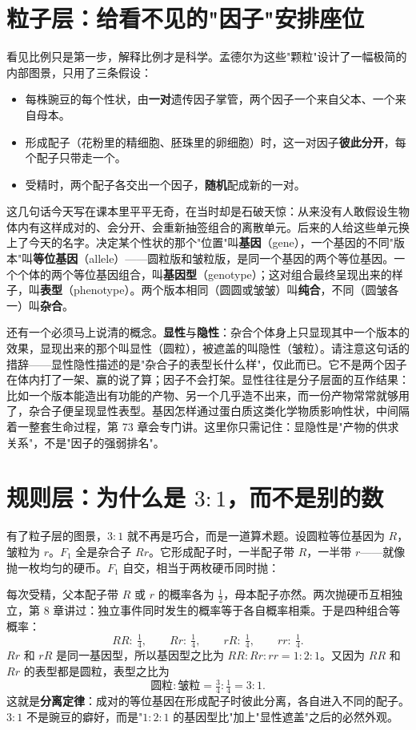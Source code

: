 \section{粒子层：给看不见的"因子"安排座位}

看见比例只是第一步，解释比例才是科学。孟德尔为这些"颗粒"设计了一幅极简的内部图景，只用了三条假设：

\begin{itemize}[itemsep=2pt]
\item 每株豌豆的每个性状，由\textbf{一对}遗传因子掌管，两个因子一个来自父本、一个来自母本。
\item 形成配子（花粉里的精细胞、胚珠里的卵细胞）时，这一对因子\textbf{彼此分开}，每个配子只带走一个。
\item 受精时，两个配子各交出一个因子，\textbf{随机}配成新的一对。
\end{itemize}

这几句话今天写在课本里平平无奇，在当时却是石破天惊：从来没有人敢假设生物体内有这样成对的、会分开、会重新抽签组合的离散单元。后来的人给这些单元换上了今天的名字。决定某个性状的那个"位置"叫\textbf{基因}（gene），一个基因的不同"版本"叫\textbf{等位基因}（allele）——圆粒版和皱粒版，是同一个基因的两个等位基因。一个个体的两个等位基因组合，叫\textbf{基因型}（genotype）；这对组合最终呈现出来的样子，叫\textbf{表型}（phenotype）。两个版本相同（圆圆或皱皱）叫\textbf{纯合}，不同（圆皱各一）叫\textbf{杂合}。

还有一个必须马上说清的概念。\textbf{显性}与\textbf{隐性}：杂合个体身上只显现其中一个版本的效果，显现出来的那个叫显性（圆粒），被遮盖的叫隐性（皱粒）。请注意这句话的措辞——显性隐性描述的是"杂合子的表型长什么样"，仅此而已。它不是两个因子在体内打了一架、赢的说了算；因子不会打架。显性往往是分子层面的互作结果：比如一个版本能造出有功能的产物、另一个几乎造不出来，而一份产物常常就够用了，杂合子便呈现显性表型。基因怎样通过蛋白质这类化学物质影响性状，中间隔着一整套生命过程，第 73 章会专门讲。这里你只需记住：显隐性是"产物的供求关系"，不是"因子的强弱排名"。

\section{规则层：为什么是 $3:1$，而不是别的数}

有了粒子层的图景，$3:1$ 就不再是巧合，而是一道算术题。设圆粒等位基因为 $R$，皱粒为 $r$。$F_1$ 全是杂合子 $Rr$。它形成配子时，一半配子带 $R$，一半带 $r$——就像抛一枚均匀的硬币。$F_1$ 自交，相当于两枚硬币同时抛：

\begin{qiaoliang}
每次受精，父本配子带 $R$ 或 $r$ 的概率各为 $\frac{1}{2}$，母本配子亦然。两次抛硬币互相独立，第 8 章讲过：独立事件同时发生的概率等于各自概率相乘。于是四种组合等概率：
\[
RR:\ \tfrac{1}{4},\qquad Rr:\ \tfrac{1}{4},\qquad rR:\ \tfrac{1}{4},\qquad rr:\ \tfrac{1}{4}.
\]
$Rr$ 和 $rR$ 是同一基因型，所以基因型之比为 $RR:Rr:rr = 1:2:1$。又因为 $RR$ 和 $Rr$ 的表型都是圆粒，表型之比为
\[
\text{圆粒}:\text{皱粒} = \tfrac{3}{4}:\tfrac{1}{4} = 3:1.
\]
这就是\textbf{分离定律}：成对的等位基因在形成配子时彼此分离，各自进入不同的配子。$3:1$ 不是豌豆的癖好，而是"$1:2:1$ 的基因型比"加上"显性遮盖"之后的必然外观。
\end{qiaoliang}


